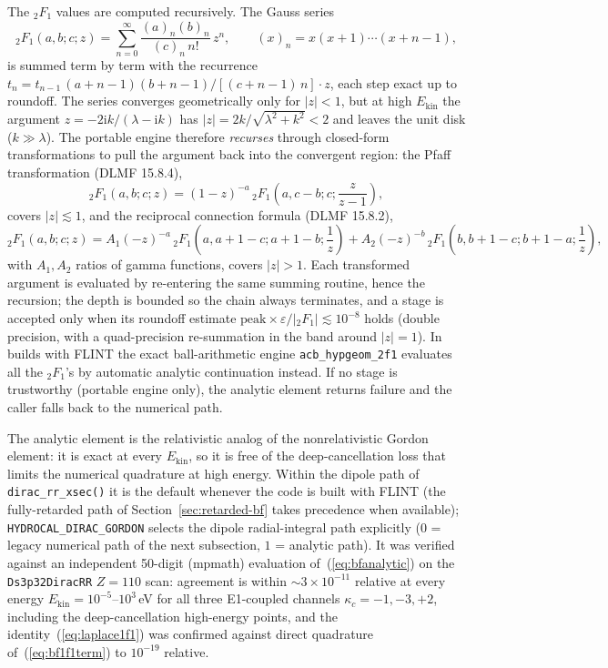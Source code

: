 \documentclass[11pt,a4paper]{article}
\newcommand{\iu}{\mathrm{i}}
\begin{document}
The ${}_{2}F_{1}$ values are computed recursively.  The Gauss series
\begin{equation}
  {}_{2}F_{1}(a,b;c;z)=\sum_{n=0}^{\infty}
    \frac{(a)_{n}(b)_{n}}{(c)_{n}\,n!}\,z^{n},
  \qquad (x)_{n}=x(x+1)\cdots(x+n-1),
  \label{eq:gaussseries}
\end{equation}
is summed term by term with the recurrence
$t_{n}=t_{n-1}\,(a+n-1)(b+n-1)\big/[(c+n-1)\,n]\cdot z$, each step exact
up to roundoff.  The series converges geometrically only for $|z|<1$,
but at high $E_{\mathrm{kin}}$ the argument
$z=-2\iu k/(\lambda-\iu k)$ has
$|z|=2k/\sqrt{\lambda^{2}+k^{2}}<2$ and leaves the unit disk
($k\gg\lambda$).  The portable engine therefore \emph{recurses} through
closed-form transformations to pull the argument back into the
convergent region: the Pfaff transformation (DLMF 15.8.4),
\begin{equation}
  {}_{2}F_{1}(a,b;c;z)=(1-z)^{-a}\,
    {}_{2}F_{1}\!\left(a,c-b;c;\frac{z}{z-1}\right),
  \label{eq:pfaff}
\end{equation}
covers $|z|\lesssim1$, and the reciprocal connection formula
(DLMF 15.8.2),
\begin{equation}
  {}_{2}F_{1}(a,b;c;z)=A_{1}(-z)^{-a}\,
    {}_{2}F_{1}\!\left(a,a{+}1{-}c;a{+}1{-}b;\frac{1}{z}\right)
    +A_{2}(-z)^{-b}\,
    {}_{2}F_{1}\!\left(b,b{+}1{-}c;b{+}1{-}a;\frac{1}{z}\right),
  \label{eq:conn2f1}
\end{equation}
with $A_{1},A_{2}$ ratios of gamma functions, covers $|z|>1$.  Each
transformed argument is evaluated by re-entering the same summing
routine, hence the recursion; the depth is bounded so the chain always
terminates, and a stage is accepted only when its roundoff estimate
$\mathrm{peak}\times\varepsilon/|{}_{2}F_{1}|\lesssim10^{-8}$ holds
(double precision, with a quad-precision re-summation in the band around
$|z|=1$).  In builds with FLINT the exact ball-arithmetic engine
{\tt acb\_hypgeom\_2f1} evaluates all the ${}_{2}F_{1}$'s by automatic
analytic continuation instead.  If no stage is trustworthy (portable
engine only), the analytic element returns failure and the caller falls
back to the numerical path.

The analytic element is the relativistic analog of the nonrelativistic
Gordon element: it is exact at every $E_{\mathrm{kin}}$, so it is free of
the deep-cancellation loss that limits the numerical quadrature at high
energy.  Within the dipole path of {\tt dirac\_rr\_xsec()} it is the
default whenever the code is built with FLINT (the fully-retarded path
of Section~\ref{sec:retarded-bf} takes precedence when available);
{\tt HYDROCAL\_DIRAC\_GORDON} selects the dipole radial-integral path
explicitly ($0$ = legacy numerical path of the next subsection, $1$ =
analytic path).  It was verified against an independent 50-digit
(mpmath) evaluation of~(\ref{eq:bfanalytic}) on the {\tt Ds3p32DiracRR}
$Z=110$ scan: agreement is within $\sim3\times10^{-11}$ relative at every
energy $E_{\mathrm{kin}}=10^{-5}$--$10^{3}$\,eV for all three E1-coupled
channels $\kappa_{c}=-1,-3,+2$, including the deep-cancellation
high-energy points, and the identity~(\ref{eq:laplace1f1}) was confirmed
against direct quadrature of~(\ref{eq:bf1f1term}) to $10^{-19}$ relative.
\end{document}
